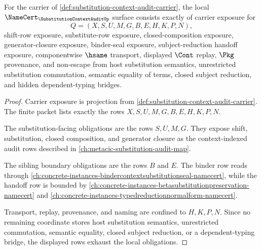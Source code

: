 \begin{theorem}
\label{thm:substitution-context-audit-namecert-obligations}
For the carrier of \autoref{def:substitution-context-audit-carrier}, the local $\NameCert_{\SubstitutionContextAuditUp}$ surface consists exactly of carrier exposure for
$$
Q=(X,S,U,M,G,B,E,H,K,P,N),
$$
shift-row exposure, substitute-row exposure, closed-composition exposure, generator-closure exposure, binder-seal exposure, subject-reduction handoff exposure, componentwise $\hsame$ transport, displayed $\Cont$ replay, $\Pkg$ provenance, and non-escape from host substitution semantics, unrestricted substitution commutation, semantic equality of terms, closed subject reduction, and hidden dependent-typing bridges.
\end{theorem}
\begin{proof}
Carrier exposure is projection from \autoref{def:substitution-context-audit-carrier}. The finite packet lists exactly the rows $X,S,U,M,G,B,E,H,K,P,N$.

The substitution-facing obligations are the rows $S,U,M,G$. They expose shift, substitution, closed composition, and generator closure as the context-indexed audit rows described in \autoref{ch:metacic-substitution-audit-map}.

The sibling boundary obligations are the rows $B$ and $E$. The binder row reads through \autoref{ch:concrete-instances-bindercontextsubstitutionseal-namecert}, while the handoff row is bounded by \autoref{ch:concrete-instances-betasubstitutionpreservation-namecert} and \autoref{ch:concrete-instances-typedreductionnormalform-namecert}.

Transport, replay, provenance, and naming are confined to $H,K,P,N$. Since no remaining coordinate stores host substitution semantics, unrestricted commutation, semantic equality, closed subject reduction, or a dependent-typing bridge, the displayed rows exhaust the local obligations.
\end{proof}

